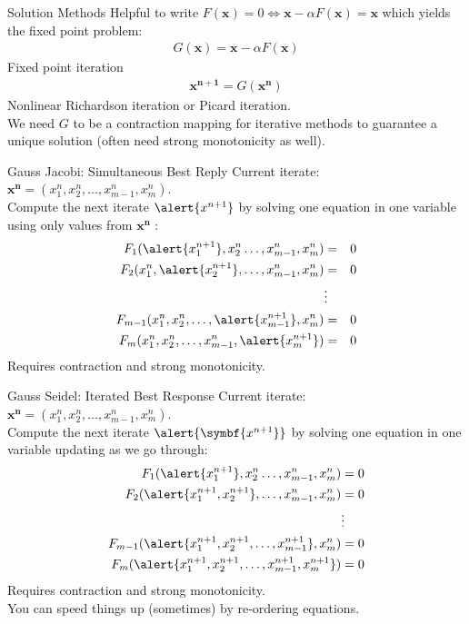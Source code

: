 \documentclass[aspectratio=169,11pt]{beamer}
\begin{document}
\begin{frame}{Solution Methods}
Helpful to write $F(\symbf{x}) = 0 \Leftrightarrow \symbf{x} - \alpha F(\symbf{x}) = \symbf{x}$ which yields the fixed point problem:
\begin{eqnarray*}
G(\symbf{x}) = \symbf{x} -\alpha F(\symbf{x})
\end{eqnarray*}
Fixed point iteration
\begin{eqnarray*}
\symbf{x^{n+1}} = G(\symbf{x^n})
\end{eqnarray*}
Nonlinear Richardson iteration or Picard iteration.\\
\vspace{0.5cm}
We need $G$ to be a \alert{contraction mapping} for iterative methods to guarantee a unique solution (often need strong monotonicity as well).
\end{frame} 

\begin{frame}{Gauss Jacobi: Simultaneous Best Reply}
Current iterate: $\symbf{x^n} = (x_1^n,x_2^n,\ldots,x_{m-1}^n,x_m^n)$.\\
\vspace{0.5cm}
Compute the next iterate $\alert{x^{n+1}}$ by solving one equation in one variable using only values from $\symbf{x^n}$ : 
\begin{eqnarray*}
F_1 (\alert{x_1^{n+1}},x_2^n \ldots, x_{m-1}^n, x_m^n)  &=& 0 \\
F_2  (x_1^n,\alert{x_2^{n+1}},\ldots,x_{m-1}^n,x_m^n)  &=& 0\\
&\vdots&\\ 
F_{m-1}  (x_1^n,x_2^n,\ldots,\alert{x_{m-1}^{n+1}},x_m^n)  &=& 0\\
F_m  (x_1^n,x_2^n,\ldots,x_{m-1}^n, \alert{x_m^{n+1}})  &=& 0
\end{eqnarray*}
Requires contraction and strong monotonicity.
\end{frame} 

\begin{frame}{Gauss Seidel: Iterated Best Response}
Current iterate: $\symbf{x^n} = (x_1^n,x_2^n,\ldots,x_{m-1}^n,x_m^n)$.\\
\vspace{0.5cm}
Compute the next iterate $\alert{\symbf{x^{n+1}}}$ by solving one equation in one variable updating as we go through:
\begin{align*}
F_1 (\alert{x_1^{n+1}},x_2^n \ldots, x_{m-1}^n, x_m^n)  &= 0 \\
F_2  (\alert{x_1^{n+1},x_2^{n+1}},\ldots,x_{m-1}^n,x_m^n)  &= 0\\
&\vdots\\ 
F_{m-1}  (\alert{x_1^{n+1},x_2^{n+1},\ldots,x_{m-1}^{n+1}},x_m^n)  &= 0\\
F_m (\alert{x_1^{n+1},x_2^{n+1},\ldots,x_{m-1}^{n+1}, x_m^{n+1}})  &= 0
\end{align*}
Requires contraction and strong monotonicity.\\
You can speed things up (sometimes) by re-ordering equations.

\end{frame} 
\end{document}
